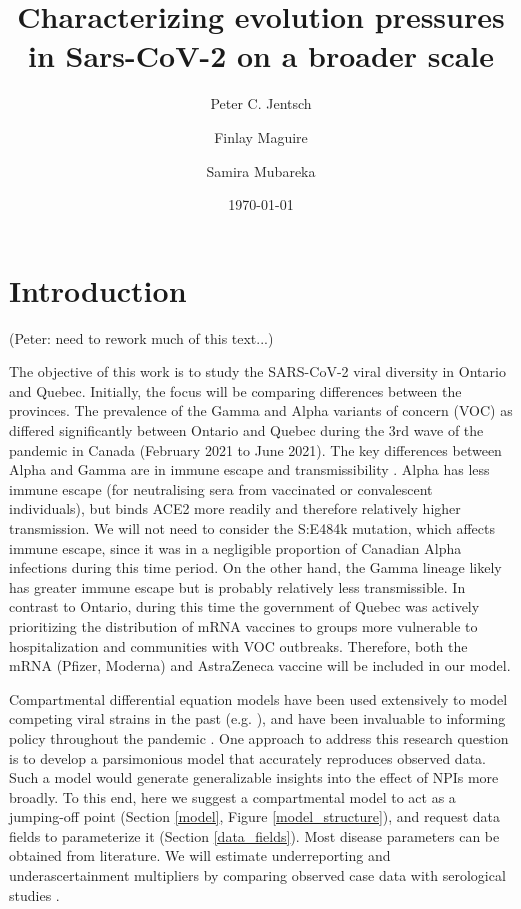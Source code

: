 \documentclass{article}
\title{Characterizing evolution pressures in Sars-CoV-2 on a broader scale}
\author[1,4]{Peter C. Jentsch}
\author[3,5]{Finlay Maguire}
\author[1,2]{Samira Mubareka}
\affil[1]{Sunnybrook Research Institute, Toronto, Canada}
\affil[2]{University of Toronto, Toronto, Canada}
\affil[3]{Dalhousie University, Halifax, Canada}
\affil[4]{Simon Fraser University, Burnaby, Canada}
\affil[5]{Shared Hospital Laboratory, Toronto, Canada}
\date{\today}                     %
\begin{document}
\maketitle

\section{Introduction}

(Peter: need to rework much of this text...)


The objective of this work is to study the SARS-CoV-2 viral diversity in Ontario and Quebec. Initially, the focus will be comparing differences between the provinces. The prevalence of the Gamma and Alpha variants of concern (VOC) as differed significantly between Ontario and Quebec during the 3rd wave of the pandemic in Canada (February 2021 to June 2021). The key differences between Alpha and Gamma are in immune escape and transmissibility \cite{agency_for_clinical_innovation_2022}. Alpha has less immune escape (for neutralising sera from vaccinated or convalescent individuals), but binds ACE2 more readily and therefore relatively higher transmission. We will not need to consider the S:E484k mutation, which affects immune escape, since it was in a negligible proportion of Canadian Alpha infections during this time period. On the other hand, the Gamma lineage likely has greater immune escape but is probably relatively less transmissible. In contrast to Ontario, during this time the government of Quebec was actively prioritizing the distribution of mRNA vaccines to groups more vulnerable to hospitalization and communities with VOC outbreaks. Therefore, both the mRNA (Pfizer, Moderna) and AstraZeneca vaccine will be included in our model.

Compartmental differential equation models have been used extensively to model competing viral strains in the past (e.g. \cite{Alizon_van_Baalen_2008, van_Baalen_Sabelis_1995, Lipsitch_Colijn_Cohen_Hanage_Fraser_2009, Nicoli_Ayabina_Trotter_Turner_Colijn_2015}), and have been invaluable to informing policy throughout the pandemic \cite{Mishra_Berah_Mellan_Unwin_Vollmer_Parag_Gandy_Flaxman_Bhatt_2020,jentsch2021prioritising, bubar2021model}.  One approach to address this research question is to develop a parsimonious model that accurately reproduces observed data. Such a model would generate generalizable insights into the effect of NPIs more broadly. To this end, here we suggest a compartmental model to act as a jumping-off point (Section \ref{model}, Figure \ref{model_structure}), and request data fields to parameterize it (Section \ref{data_fields}). Most disease parameters can be obtained from literature. We will estimate underreporting and underascertainment multipliers by comparing observed case data with serological studies \cite{jentsch2021prioritising}.
\end{document}
